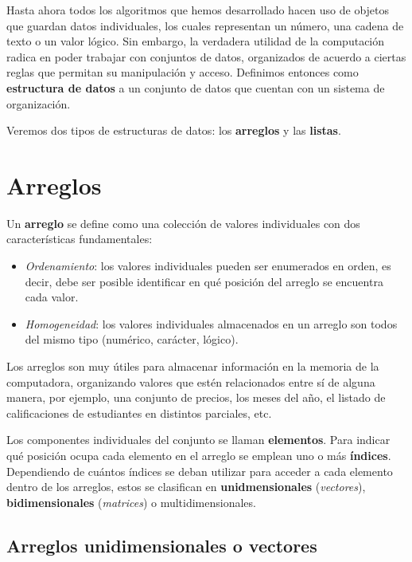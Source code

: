 \documentclass[
]{book}
\providecommand{\tightlist}{%
  \setlength{\itemsep}{0pt}\setlength{\parskip}{0pt}}
\begin{document}
Hasta ahora todos los algoritmos que hemos desarrollado hacen uso de objetos que guardan datos individuales, los cuales representan un número, una cadena de texto o un valor lógico. Sin embargo, la verdadera utilidad de la computación radica en poder trabajar con conjuntos de datos, organizados de acuerdo a ciertas reglas que permitan su manipulación y acceso. Definimos entonces como \textbf{estructura de datos} a un conjunto de datos que cuentan con un sistema de organización.

Veremos dos tipos de estructuras de datos: los \textbf{arreglos} y las \textbf{listas}.

\hypertarget{arreglos}{%
\section{Arreglos}\label{arreglos}}

Un \textbf{arreglo} se define como una colección de valores individuales con dos características fundamentales:

\begin{itemize}
\tightlist
\item
  \emph{Ordenamiento}: los valores individuales pueden ser enumerados en orden, es decir, debe ser posible identificar en qué posición del arreglo se encuentra cada valor.
\item
  \emph{Homogeneidad}: los valores individuales almacenados en un arreglo son todos del mismo tipo (numérico, carácter, lógico).
\end{itemize}

Los arreglos son muy útiles para almacenar información en la memoria de la computadora, organizando valores que estén relacionados entre sí de alguna manera, por ejemplo, una conjunto de precios, los meses del año, el listado de calificaciones de estudiantes en distintos parciales, etc.

Los componentes individuales del conjunto se llaman \textbf{elementos}. Para indicar qué posición ocupa cada elemento en el arreglo se emplean uno o más \textbf{índices}. Dependiendo de cuántos índices se deban utilizar para acceder a cada elemento dentro de los arreglos, estos se clasifican en \textbf{unidmensionales} (\emph{vectores}), \textbf{bidimensionales} (\emph{matrices}) o multidimensionales.

\hypertarget{arreglos-unidimensionales-o-vectores}{%
\subsection{Arreglos unidimensionales o vectores}\label{arreglos-unidimensionales-o-vectores}}
\end{document}
